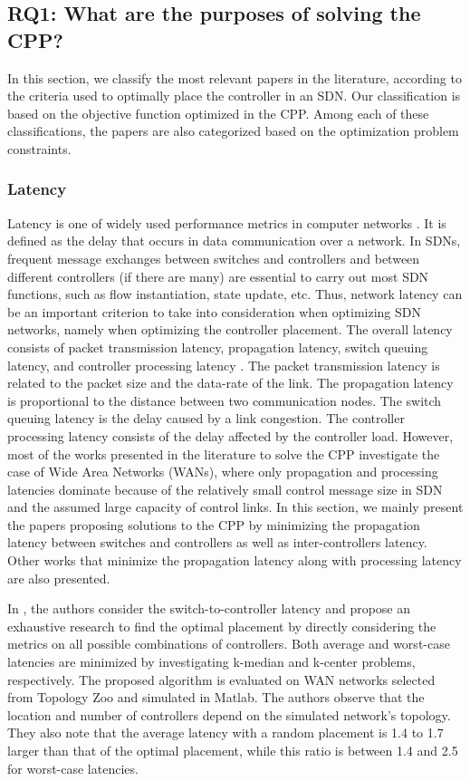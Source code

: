 \documentclass{IEEEtran}
\begin{document}
\subsection{RQ1: What are the purposes of solving the CPP?}

In this section, we classify the most relevant papers in the literature, according to the criteria used to optimally place the controller in an SDN. Our classification is based on the objective function optimized in the CPP. Among each of these classifications, the papers are also categorized based on the optimization problem constraints.

\subsubsection{Latency}
Latency is one of widely used performance metrics in computer networks \cite{SiHa15}. It is defined as the delay that occurs in data communication over a network. In SDNs, frequent message exchanges between switches and controllers and between different controllers (if there are many) are essential to carry out most SDN functions, such as flow instantiation, state update, etc. Thus, network latency can be an important criterion to take into consideration when optimizing SDN networks, namely when optimizing the controller placement. The overall latency consists of packet transmission latency, propagation latency, switch queuing latency, and controller processing latency \cite{WaZh17}. The packet transmission latency is related to the packet size and the data-rate of the link. The propagation latency is proportional to the distance between two communication nodes. The switch queuing latency is the delay caused by a link congestion. The controller processing latency consists of the delay affected by the controller load. However, most of the works presented in the literature to solve the CPP investigate the case of Wide Area Networks (WANs), where only propagation and processing latencies dominate because of the relatively small control message size in SDN and the assumed large capacity of control links. In this section, we mainly present the papers proposing solutions to the CPP by minimizing the propagation latency between switches and controllers as well as inter-controllers latency. Other works that minimize the propagation latency along with processing latency are also presented.

In \cite{HeSh12}, the authors consider the switch-to-controller latency and propose an exhaustive research to find the optimal placement by directly considering the metrics on all possible combinations of controllers. Both average and worst-case latencies are minimized by investigating k-median and k-center problems, respectively. The proposed algorithm is evaluated on WAN networks selected from Topology Zoo and simulated in Matlab. The authors observe that the location and number of controllers depend on the simulated network's topology. They also note that the average latency with a random placement is 1.4 to 1.7 larger than that of the optimal placement, while this ratio is between 1.4 and 2.5 for worst-case latencies. 
\end{document}

